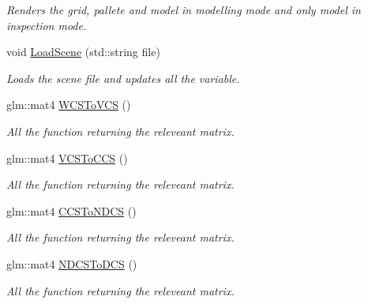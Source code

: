 \begin{DoxyCompactItemize}
\begin{DoxyCompactList}\small\item\em Renders the grid, pallete and model in modelling mode and only model in inspection mode. \end{DoxyCompactList}\item 
void \hyperlink{classcft_1_1Scene_ab323e3276fe73f7a771830ae4502ec7e}{Load\+Scene} (std\+::string file)\hypertarget{classcft_1_1Scene_ab323e3276fe73f7a771830ae4502ec7e}{}\label{classcft_1_1Scene_ab323e3276fe73f7a771830ae4502ec7e}

\begin{DoxyCompactList}\small\item\em Loads the scene file and updates all the variable. \end{DoxyCompactList}\end{DoxyCompactItemize}
{\bf }\par
\begin{DoxyCompactItemize}
\item 
glm\+::mat4 \hyperlink{classcft_1_1Scene_aa171f31d1f6219ba6bc6792d9247ae7d}{W\+C\+S\+To\+V\+CS} ()\hypertarget{classcft_1_1Scene_aa171f31d1f6219ba6bc6792d9247ae7d}{}\label{classcft_1_1Scene_aa171f31d1f6219ba6bc6792d9247ae7d}

\begin{DoxyCompactList}\small\item\em All the function returning the releveant matrix. \end{DoxyCompactList}\item 
glm\+::mat4 \hyperlink{classcft_1_1Scene_a40921d50edb9b68766c8764446d12fe9}{V\+C\+S\+To\+C\+CS} ()\hypertarget{classcft_1_1Scene_a40921d50edb9b68766c8764446d12fe9}{}\label{classcft_1_1Scene_a40921d50edb9b68766c8764446d12fe9}

\begin{DoxyCompactList}\small\item\em All the function returning the releveant matrix. \end{DoxyCompactList}\item 
glm\+::mat4 \hyperlink{classcft_1_1Scene_a91f4d52de5e1999c87127d5f5bbe62e0}{C\+C\+S\+To\+N\+D\+CS} ()\hypertarget{classcft_1_1Scene_a91f4d52de5e1999c87127d5f5bbe62e0}{}\label{classcft_1_1Scene_a91f4d52de5e1999c87127d5f5bbe62e0}

\begin{DoxyCompactList}\small\item\em All the function returning the releveant matrix. \end{DoxyCompactList}\item 
glm\+::mat4 \hyperlink{classcft_1_1Scene_a13a19d6814ec51ce451618a682e99955}{N\+D\+C\+S\+To\+D\+CS} ()\hypertarget{classcft_1_1Scene_a13a19d6814ec51ce451618a682e99955}{}\label{classcft_1_1Scene_a13a19d6814ec51ce451618a682e99955}

\begin{DoxyCompactList}\small\item\em All the function returning the releveant matrix. \end{DoxyCompactList}\end{DoxyCompactItemize}

